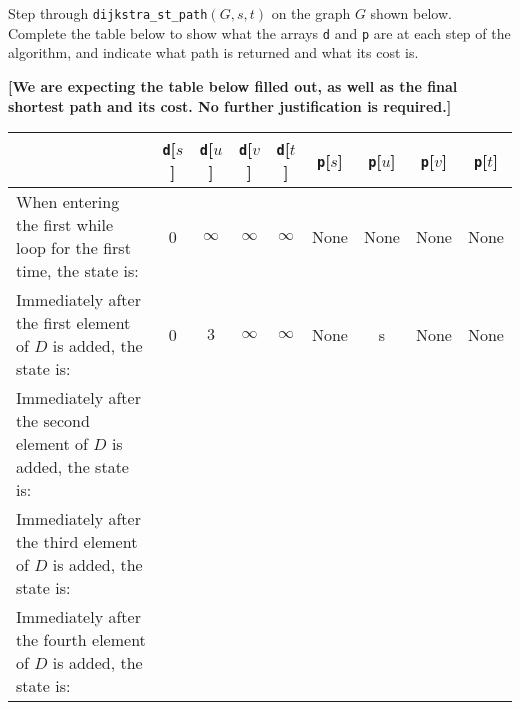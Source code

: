 \documentclass[12pt]{article}
\begin{document}
\begin{enumerate}
Step through \texttt{dijkstra\_st\_path}$(G,s,t)$ on the graph $G$ shown below. Complete the table below to show what the arrays \texttt{d} and \texttt{p} are at each step of the algorithm, and indicate what path is returned and what its cost is.

\begin{center}
\end{center}

    \textbf{[We are expecting the table below filled out, as well as the final shortest path and its cost.  No further justification is required.]}


\begin{center}
\def\arraystretch{1.5}
\newcommand{\td}{\texttt{d}}
\newcommand{\tp}{\texttt{p}}
\begin{tabular}{|p{6cm}||c|c|c|c||c|c|c|c|}
\hline
& \td[$s$] & \td[$u$] & \td[$v$] & \td[$t$] & \tp[$s$] & \tp[$u$] & \tp[$v$] & \tp[$t$] \\
\hline
When entering the first while loop for the first time, the state is:&
0 & $\infty$ & $\infty$ & $\infty$ & None & None & None & None \\
\hline
Immediately after the first element of $D$ is added, the state is: &
0 & $3$ & $\infty$ & $\infty$ & None & s & None & None \\
 \hline
Immediately after the second element of $D$ is added, the state is: &
 & & & & & & & \\
 \hline
Immediately after the third element of $D$ is added, the state is: &
 & & & & & & & \\
 \hline
Immediately after the fourth element of $D$ is added, the state is: &
 & & & & & & & \\
 \hline
\end{tabular}
\end{center}


\end{enumerate}
\end{document}
